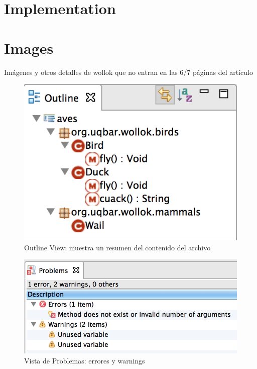\documentclass[preprint,10pt]{sigplanconf}
\begin{document}
% 
% 

% 

{
\small


}

\newpage
\appendix
\section{Implementation}
\label{sec:implementation}

\section{Images}
Imágenes y otros detalles de wollok que no entran en las 6/7 páginas del artículo

	\begin{figure}[p]
	    \centering
		\includegraphics[scale=0.5]{images/wollok-paper-outline.png}
	    \caption{Outline View: muestra un resumen del contenido del archivo}
	    \label{fig:outline.png}
	\end{figure}
	
	\begin{figure}[p]
	    \centering
		\includegraphics[scale=0.5]{images/wollok-paper-check-problemsview.png}
	    \caption{Vista de Problemas: errores y warnings}
	    \label{fig:problemsview.png}
	\end{figure}
	
\end{document}
